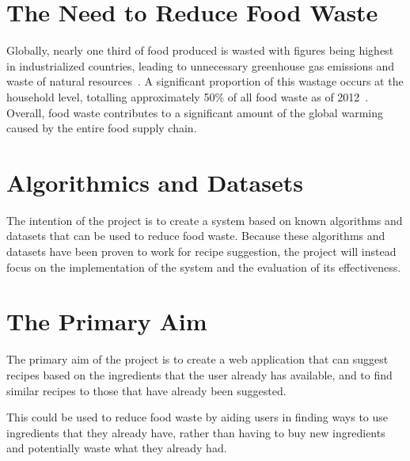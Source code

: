 {
\let\clearpage\relax

\section{The Need to Reduce Food Waste}
Globally, nearly one third of food produced is wasted with figures being highest
in industrialized countries, leading to unnecessary greenhouse gas emissions and
waste of natural resources~\cite{gustavsson_global_2011}. A significant proportion
of this wastage occurs at the household level, totalling approximately 50\% of all
food waste as of 2012~\cite{stenmarck_estimates_2016}. Overall, food waste contributes
to a significant amount of the global warming caused by the entire food supply
chain.~\cite{scherhaufer_environmental_2018}

\section{Algorithmics and Datasets}
The intention of the project is to create a system based on known algorithms and
datasets that can be used to reduce food waste. Because these algorithms and
datasets have been proven to work for recipe suggestion, the project will instead
focus on the implementation of the system and the evaluation of its effectiveness.

\section{The Primary Aim}
The primary aim of the project is to create a web application that can suggest
recipes based on the ingredients that the user already has available, and to
find similar recipes to those that have already been suggested.

This could be used to reduce food waste by aiding users in finding ways to use
ingredients that they already have, rather than having to buy new ingredients
and potentially waste what they already had.

} %
